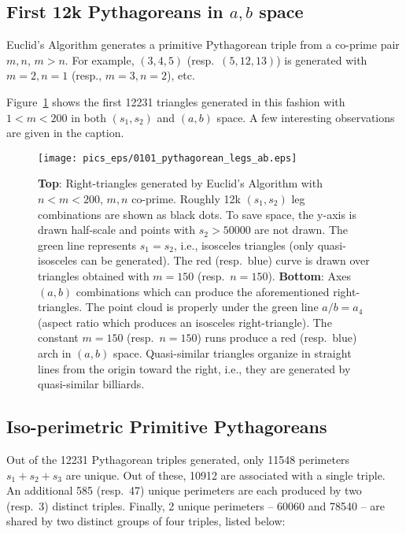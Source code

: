\subsection{First 12k Pythagoreans in $a,b$ space}

Euclid's Algorithm generates a primitive Pythagorean triple from a co-prime pair $m,n$, $m>n$. For example, $(3,4,5)$ (resp.~$(5,12,13)$) is generated with $m=2,n=1$ (resp., $m=3,n=2$), etc.

Figure~\ref{fig:pythagorean} shows the first 12231 triangles generated in this fashion with $1<m<200$ in both $(s_1,s_2)$ and $(a,b)$ space. A few interesting observations are given in the caption. 

\begin{figure}[H]
    \centering
    \texttt{[image: pics\_eps/0101\_pythagorean\_legs\_ab.eps]}
    \caption{\textbf{Top}: Right-triangles generated by Euclid's Algorithm with $n<m<200$, $m,n$ co-prime. Roughly 12k $(s_1,s_2)$ leg combinations are shown as black dots. To save space, the y-axis is drawn half-scale and points with $s_2>50000$ are not drawn. The green line represents $s_1=s_2$, i.e., isosceles triangles (only quasi-isosceles can be generated). The red (resp.~blue) curve is drawn over triangles obtained with $m=150$ (resp.~$n=150$). \textbf{Bottom}: Axes $(a,b)$ combinations which can produce the aforementioned right-triangles. The point cloud is properly under the green line $a/b=a_4$ (aspect ratio which produces an isosceles right-triangle). The constant $m=150$ (resp.~$n=150$) runs produce a red (resp.~blue) arch in $(a,b)$ space. Quasi-similar triangles organize in straight lines from the origin toward the right, i.e., they are generated by quasi-similar billiards.}
    \label{fig:pythagorean}
\end{figure}

\subsection{Iso-perimetric Primitive Pythagoreans}

Out of the 12231 Pythagorean triples generated, only 11548 perimeters $s_1+s_2+s_3$ are unique. Out of these, 10912 are associated with a single triple. An additional 585 (resp.~47) unique perimeters are each produced by two (resp.~3) distinct triples. Finally, 2 unique perimeters -- 60060 and 78540 -- are shared by two distinct groups of four triples, listed below:

